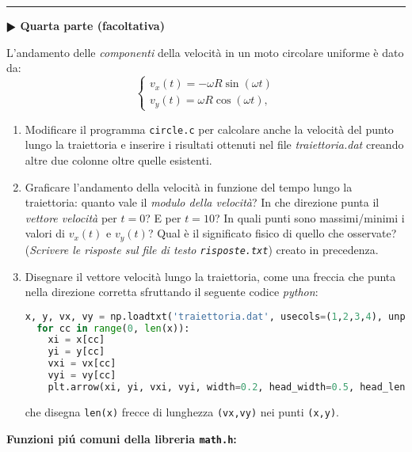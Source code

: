 \documentclass[11pt]{article}
\begin{document}
\hrule
\vspace{1mm}\textbf{$\RHD$ Quarta parte (facoltativa)\\}

L'andamento delle {\em componenti\/} della velocit\`a in un moto circolare uniforme \`e dato da:
\[
\left\{ \begin{array}{ll} 
v_x(t) = - \omega R \sin \left(\omega t \right)
\\ 
v_y(t) = \omega R \cos \left(\omega t \right),
\end{array}
\right.
\]

\begin{enumerate}
\item Modificare il programma \texttt{circle.c} per calcolare anche la velocit\`a del punto lungo la traiettoria e inserire i risultati ottenuti nel file {\em traiettoria.dat} creando altre due colonne oltre quelle esistenti.
\item Graficare l'andamento della velocit\`a in funzione del tempo lungo la traiettoria: quanto vale il {\em modulo della velocit\`a\/}? In che direzione punta il {\em vettore velocit\`a\/} per $t=0$?
E per $t=10$? In quali punti  sono massimi/minimi i valori di $v_x(t)$ e $v_y(t)$? Qual \`e il significato fisico di quello che osservate? ({\em Scrivere le risposte sul file di testo \texttt{risposte.txt}\/}) creato in precedenza.
\item Disegnare il vettore velocit\`a lungo la traiettoria, come una freccia che punta nella direzione corretta sfruttando
  il seguente codice \emph{python}:\\

\begin{lstlisting}[language=Python,numbers=none]
  x, y, vx, vy = np.loadtxt('traiettoria.dat', usecols=(1,2,3,4), unpack=True)
  for cc in range(0, len(x)):
    xi = x[cc]
    yi = y[cc]
    vxi = vx[cc]
    vyi = vy[cc]
    plt.arrow(xi, yi, vxi, vyi, width=0.2, head_width=0.5, head_length=0.3,           fc='r', ec='r')   
\end{lstlisting}
che disegna \texttt{len(x)} frecce di lunghezza \texttt{(vx,vy)} nei punti \texttt{(x,y)}. 
\end{enumerate}  
\vspace{-2mm}
\newpage
\textbf{Funzioni pi\'u comuni della libreria \texttt{math.h}:}
\end{document}
